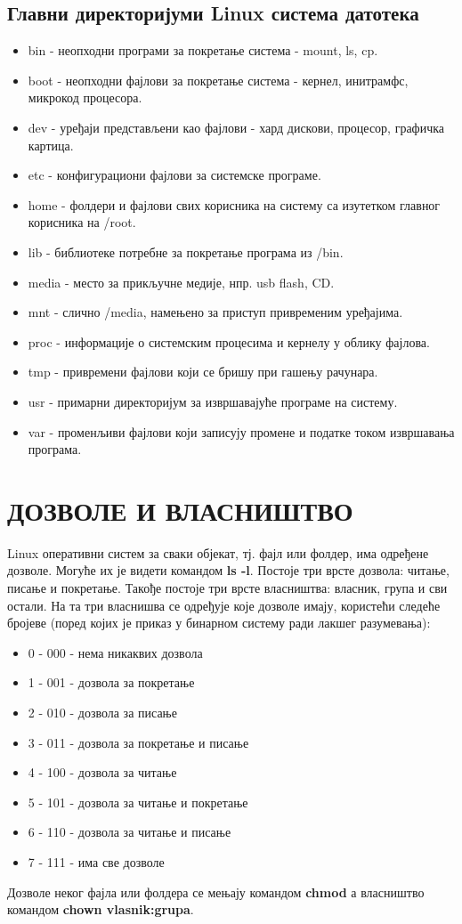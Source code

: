 \documentclass[a4paper,14pt]{article}
\begin{document}
\subsection{Главни директоријуми Linux система датотека}
\begin{itemize}
\item bin - неопходни програми за покретање система - mount, ls, cp.
\item boot - неопходни фајлови за покретање система - кернел, инитрамфс, микрокод процесора.
\item dev - уређаји представљени као фајлови - хард дискови, процесор, графичка картица.
\item etc - конфигурациони фајлови за системске програме.
\item home - фолдери и фајлови свих корисника на систему са изутетком главног корисника на /root.
\item lib - библиотеке потребне за покретање програма из /bin.
\item media - место за прикључне медије, нпр. usb flash, CD.
\item mnt - слично /media, намењено за приступ привременим уређајима.
\item proc - информације о системским процесима и кернелу у облику фајлова.
\item tmp - привремени фајлови који се бришу при гашењу рачунара.
\item usr - примарни директоријум за извршавајуће програме на систему.
\item var - променљиви фајлови који записују промене и податке током извршавања програма.
\end{itemize}
\newpage

\section{ДОЗВОЛЕ И ВЛАСНИШТВО}
Linux оперативни систем за сваки објекат, тј. фајл или фолдер, има одређене дозволе. Могуће их је видети командом \textbf{ls -l}. Постоје три врсте дозвола: читање, писање и покретање. Такође постоје три врсте власништва: власник, група и сви остали. На та три власнишва се одређује које дозволе имају, користећи следеће бројеве (поред којих је приказ у бинарном систему ради лакшег разумевања):
\begin{itemize}
\item 0 - 000 - нема никаквих дозвола
\item 1 - 001 - дозвола за покретање
\item 2 - 010 - дозвола за писање
\item 3 - 011 - дозвола за покретање и писање
\item 4 - 100 - дозвола за читање
\item 5 - 101 - дозвола за читање и покретање
\item 6 - 110 - дозвола за читање и писање
\item 7 - 111 - има све дозволе
\end{itemize}
Дозволе неког фајла или фолдера се мењају командом \textbf{chmod} а власништво командом \textbf{chown vlasnik:grupa}.
\end{document}
